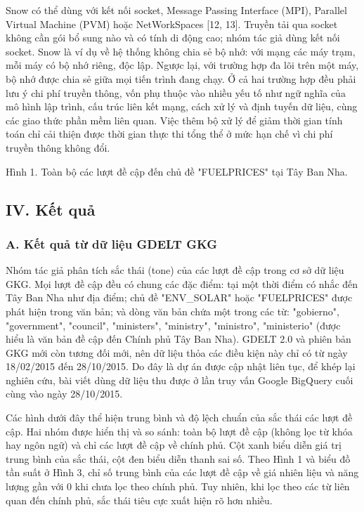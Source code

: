 Snow có thể dùng với kết nối socket, Message Passing Interface (MPI), Parallel Virtual Machine (PVM) hoặc NetWorkSpaces {[}12, 13{]}. Truyền tải qua socket không cần gói bổ sung nào và có tính di động cao; nhóm tác giả dùng kết nối socket. Snow là ví dụ về hệ thống không chia sẻ bộ nhớ: với mạng các máy trạm, mỗi máy có bộ nhớ riêng, độc lập. Ngược lại, với trường hợp đa lõi trên một máy, bộ nhớ được chia sẻ giữa mọi tiến trình đang chạy. Ở cả hai trường hợp đều phải lưu ý chi phí truyền thông, vốn phụ thuộc vào nhiều yếu tố như ngữ nghĩa của mô hình lập trình, cấu trúc liên kết mạng, cách xử lý và định tuyến dữ liệu, cùng các giao thức phần mềm liên quan. Việc thêm bộ xử lý để giảm thời gian tính toán chỉ cải thiện được thời gian thực thi tổng thể ở mức hạn chế vì chi phí truyền thông không đổi.

Hình 1. Toàn bộ các lượt đề cập đến chủ đề "FUELPRICES" tại Tây Ban Nha.

\subsection{IV. Kết quả}

\subsubsection{A. Kết quả từ dữ liệu GDELT GKG}

Nhóm tác giả phân tích sắc thái (tone) của các lượt đề cập trong cơ sở dữ liệu GKG. Mọi lượt đề cập đều có chung các đặc điểm: tại một thời điểm có nhắc đến Tây Ban Nha như địa điểm; chủ đề "ENV\_SOLAR" hoặc "FUELPRICES" được phát hiện trong văn bản; và dòng văn bản chứa một trong các từ: "gobierno", "government", "council", "ministers", "ministry", "ministro", "ministerio" (được hiểu là văn bản đề cập đến Chính phủ Tây Ban Nha). GDELT 2.0 và phiên bản GKG mới còn tương đối mới, nên dữ liệu thỏa các điều kiện này chỉ có từ ngày 18/02/2015 đến 28/10/2015. Do đây là dự án được cập nhật liên tục, để khép lại nghiên cứu, bài viết dùng dữ liệu thu được ở lần truy vấn Google BigQuery cuối cùng vào ngày 28/10/2015.

Các hình dưới đây thể hiện trung bình và độ lệch chuẩn của sắc thái các lượt đề cập. Hai nhóm được hiển thị và so sánh: toàn bộ lượt đề cập (không lọc từ khóa hay ngôn ngữ) và chỉ các lượt đề cập về chính phủ. Cột xanh biểu diễn giá trị trung bình của sắc thái, cột đen biểu diễn thanh sai số. Theo Hình 1 và biểu đồ tần suất ở Hình 3, chỉ số trung bình của các lượt đề cập về giá nhiên liệu và năng lượng gần với 0 khi chưa lọc theo chính phủ. Tuy nhiên, khi lọc theo các từ liên quan đến chính phủ, sắc thái tiêu cực xuất hiện rõ hơn nhiều.

